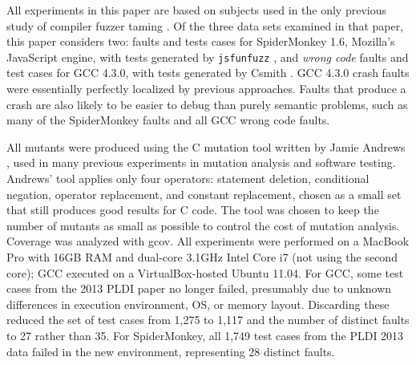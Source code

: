 



All experiments in this paper are based on subjects used in the only previous study of compiler fuzzer taming \cite{PLDI13}.  Of the three data sets examined in that paper, this paper considers two:  faults and tests cases for SpiderMonkey 1.6, Mozilla's JavaScript engine, with tests generated by {\tt jsfunfuzz} \cite{jsfunfuzz}, and \emph{wrong code} faults and test cases for GCC 4.3.0, with tests generated by Csmith \cite{csmith}.  GCC 4.3.0 crash faults were essentially perfectly localized by previous approaches.  Faults that produce a crash are also likely to be easier to debug than purely semantic problems, such as many of the SpiderMonkey faults and all GCC wrong code faults.

All mutants were produced using the C mutation tool written by Jamie Andrews \cite{mutant}, used in many previous experiments in mutation analysis and software testing.  Andrews' tool applies only four operators: statement deletion, conditional negation, operator replacement, and constant replacement, chosen as a small set that still produces good results for C code.  The tool was chosen to keep the number of mutants as small as possible to control the cost of mutation analysis.  Coverage was analyzed with gcov.   All experiments were performed on a MacBook Pro with 16GB RAM and dual-core 3.1GHz Intel Core i7 (not using the second core); GCC executed on a VirtualBox-hosted Ubuntu 11.04.  For GCC, some test cases from the 2013 PLDI paper no longer failed, presumably due to unknown differences in execution environment, OS, or memory layout. Discarding these reduced the set of test cases from 1,275 to 1,117 and the number of distinct faults to 27 rather than 35.  For SpiderMonkey, all 1,749 test cases from the PLDI 2013 data failed in the new environment, representing 28 distinct faults.

